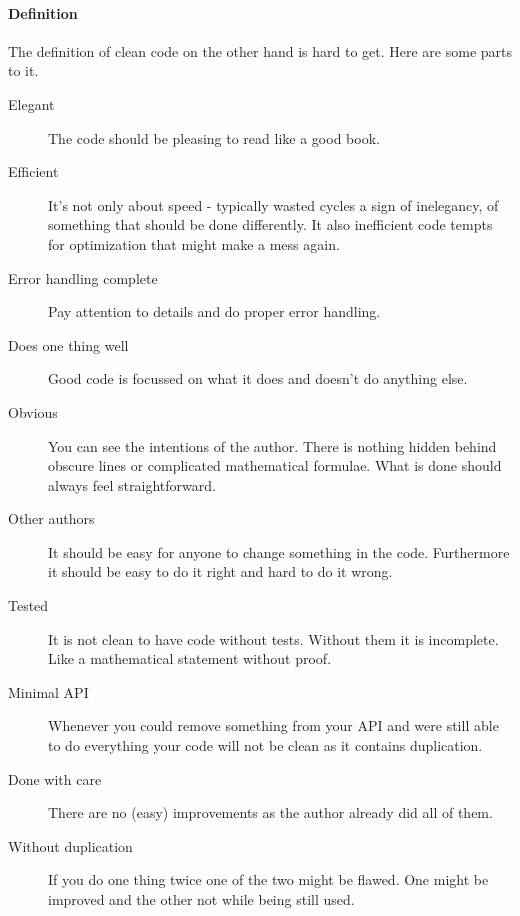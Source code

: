 \documentclass[a4paper, twocolumn]{article}
\begin{document}
\paragraph{Definition}
The definition of clean code on the other hand is hard to get. Here are some parts to it.
\begin{description}
	\item[Elegant] The code should be pleasing to read like a good book.
	\item[Efficient] It's not only about speed - typically wasted cycles a sign of inelegancy, of something that should be done differently. It also inefficient code tempts for optimization that might make a mess again.
	\item[Error handling complete] Pay attention to details and do proper error handling.
	\item[Does one thing well] Good code is focussed on what it does and doesn't do anything else.
	\item[Obvious] You can see the intentions of the author. There is nothing hidden behind obscure lines or complicated mathematical formulae. What is done should always feel straightforward.
	\item[Other authors] It should be easy for anyone to change something in the code. Furthermore it should be easy to do it right and hard to do it wrong.
	\item[Tested] It is not clean to have code without tests. Without them it is incomplete. Like a mathematical statement without proof.
	\item[Minimal API] Whenever you could remove something from your API and were still able to do everything your code will not be clean as it contains duplication.
	\item[Done with care] There are no (easy) improvements as the author already did all of them.
	\item[Without duplication] If you do one thing twice one of the two might be flawed. One might be improved and the other not while being still used.
\end{description}
\end{document}
